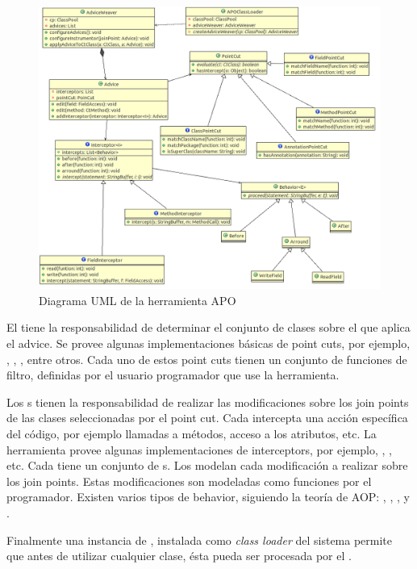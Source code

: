 \begin{figure}[!htb]
	\centering
	\includegraphics[scale=0.4]{img/apo}
	\caption{Diagrama UML de la herramienta APO}
	\label{aopImage}
\end{figure}	 


El  tiene la responsabilidad de determinar el conjunto de
clases sobre el que aplica el advice. Se provee algunas implementaciones básicas
de point cuts, por ejemplo, , , 
, entre otros. Cada uno de estos point cuts tienen un conjunto de funciones
de filtro, definidas por el usuario programador que use la herramienta. 

Los s tienen la responsabilidad de realizar las modificaciones sobre 
los join points de las clases seleccionadas por el point cut. 
Cada  intercepta una acción específica del código, por ejemplo
llamadas a métodos, acceso a los atributos, etc. La herramienta provee algunas implementaciones de interceptors,
por ejemplo, , , etc. 
Cada  tiene un conjunto de s.
Los  modelan cada modificación a realizar sobre los join points. 
Estas modificaciones son modeladas como funciones por el programador.
Existen varios tipos de behavior, siguiendo la teoría de AOP: 
, , ,  y . 
 
Finalmente una instancia de , instalada como \emph{class
loader} del sistema permite que antes de utilizar cualquier clase, ésta pueda
ser procesada por el .

